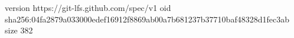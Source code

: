 version https://git-lfs.github.com/spec/v1
oid sha256:04fa2879a033000edef16912f8869ab00a7b681237b37710baf48328d1fec3ab
size 382
